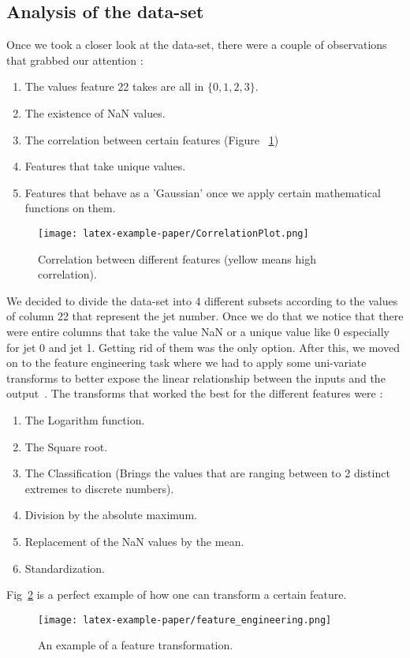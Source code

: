 \documentclass[10pt,conference,compsocconf]{IEEEtran}
\begin{document}
\subsection{Analysis of the data-set}
Once we took a closer look at the data-set, there were a couple of observations that grabbed our attention :
\begin{enumerate}
\item The values feature 22 takes are all in $\{0,1,2,3\}$.
\item The existence of NaN values.
\item The correlation between certain features (Figure ~\ref{fig:correlation_table})
\item Features that take unique values.
\item Features that behave as a 'Gaussian' once we apply certain mathematical functions on them.
\end{enumerate}

\begin{figure}[htbp]
  \centering
  \texttt{[image: latex-example-paper/CorrelationPlot.png]}
  \vspace{-7mm}
  \caption{Correlation between different features (yellow means high correlation).}
  \vspace{-3mm}
  \label{fig:correlation_table}
\end{figure}
We decided to divide the data-set into 4 different subsets according to the values of column 22 that represent the jet number. Once we do that we notice that there were entire columns that take the value NaN or a unique value like 0 especially for jet 0 and jet 1. Getting rid of them was the only option.
After this, we moved on to the feature engineering task where we had to apply some uni-variate transforms to better expose the linear relationship between the inputs and the output~\cite{MLlogistic}. The transforms that worked the best for the different features were : \begin{enumerate}
\item The Logarithm function.
\item The Square root.
\item The Classification (Brings the values that are ranging between to 2 distinct extremes to discrete numbers).
\item Division by the absolute maximum.
\item Replacement of the NaN values by the mean.
\item Standardization.
\end{enumerate}
Fig~\ref{fig:feature_engineering_example} is a perfect example of how one can transform a certain feature.
\begin{figure}[htbp]
  \centering
  \texttt{[image: latex-example-paper/feature\_engineering.png]}
  \vspace{-7mm}
  \caption{An example of a feature transformation.}
  \vspace{-3mm}
  \label{fig:feature_engineering_example}
\end{figure} 
\end{document}
